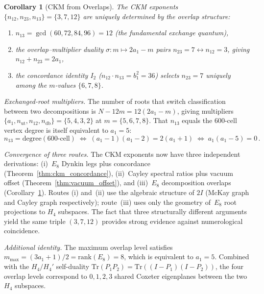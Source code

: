 \documentclass[12pt,a4paper]{article}
\newtheorem{corollary}{Corollary}
\theoremstyle{definition}
\begin{document}
\begin{corollary}[CKM from Overlaps]
\label{cor:ckm_overlap}
The CKM exponents $\{n_{12}, n_{23}, n_{13}\} = \{3, 7, 12\}$ are uniquely determined by the overlap structure:
\begin{enumerate}
\item $n_{13} = \gcd(60, 72, 84, 96) = 12$ (the fundamental exchange quantum),
\item the overlap--multiplier duality $\sigma\colon m \mapsto 2a_1 - m$ pairs $n_{23} = 7 \leftrightarrow n_{12} = 3$, giving $n_{12} + n_{23} = 2a_1$,
\item the concordance identity $I_2$ ($n_{12} \cdot n_{13} = b_1^2 = 36$) selects $n_{23} = 7$ uniquely among the $m$-values $\{6, 7, 8\}$.
\end{enumerate}
\end{corollary}

\noindent\textit{Exchanged-root multipliers.}  The number of roots that switch classification between two decompositions is $N - 12m = 12(2a_1 - m)$, giving multipliers $\{a_1, n_{\mathrm{ut}}, n_{12}, n_{\mathrm{db}}\} = \{5, 4, 3, 2\}$ at $m = \{5, 6, 7, 8\}$.  That $n_{13}$ equals the 600-cell vertex degree is itself equivalent to $a_1 = 5$:
\begin{equation}
n_{13} = \mathrm{degree}(600\text{-cell}) \;\Longleftrightarrow\; (a_1-1)(a_1-2) = 2(a_1+1) \;\Longleftrightarrow\; a_1(a_1-5) = 0\,.
\label{eq:n13_degree}
\end{equation}

\noindent\textit{Convergence of three routes.}  The CKM exponents now have three independent derivations: (i)~$E_8$ Dynkin legs plus concordance (Theorem~\ref{thm:ckm_concordance}), (ii)~Cayley spectral ratios plus vacuum offset (Theorem~\ref{thm:vacuum_offset}), and (iii)~$E_8$ decomposition overlaps (Corollary~\ref{cor:ckm_overlap}).  Routes (i) and~(ii) use the algebraic structure of $2I$ (McKay graph and Cayley graph respectively); route~(iii) uses only the geometry of~$E_8$ root projections to $H_4$ subspaces.  The fact that three structurally different arguments yield the same triple $(3, 7, 12)$ provides strong evidence against numerological coincidence.

\noindent\textit{Additional identity.}  The maximum overlap level satisfies $m_{\max} = (3a_1 + 1)/2 = \mathrm{rank}(E_8) = 8$, which is equivalent to $a_1 = 5$.  Combined with the $H_4/H_4'$ self-duality $\mathrm{Tr}(P_1 P_2) = \mathrm{Tr}((I-P_1)(I-P_2))$, the four overlap levels correspond to $0, 1, 2, 3$ shared Coxeter eigenplanes between the two $H_4$ subspaces.
\end{document}
